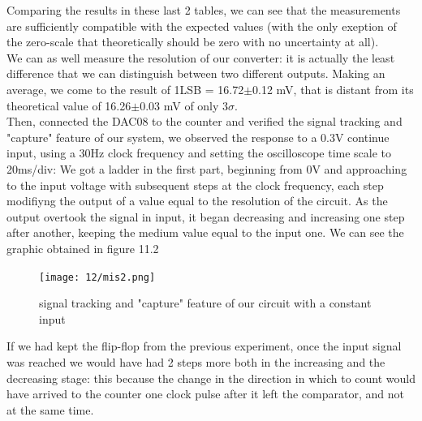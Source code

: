 Comparing the results in these last 2 tables, we can see that the measurements are sufficiently compatible with the expected values (with the only exeption of the zero-scale that theoretically should be zero with no uncertainty at all).\\
We can as well measure the resolution of our converter: it is actually the least difference that we can distinguish between two different outputs. Making an average, we come to the result of 1LSB = 16.72\(\pm\)0.12 mV, that is distant from its theoretical value of 16.26\(\pm\)0.03 mV of only 3\(\sigma\). \\
Then, connected the DAC08 to the counter and verified the signal tracking and "capture" feature of our system, we observed the response to a 0.3V continue input, using a 30Hz clock frequency and setting the oscilloscope time scale to 20ms/div: We got a ladder in the first part, beginning from 0V and approaching to the input voltage with subsequent steps at the clock frequency, each step modifiyng the output of a value equal to the resolution of the circuit. As the output overtook the signal in input, it began decreasing and increasing one step after another, keeping the medium value equal to the input one.
We can see the graphic obtained in figure 11.2\\

\begin{figure}[H]
\centering
\texttt{[image: 12/mis2.png]}
\caption{signal tracking and "capture" feature of our circuit with a constant input}
\end{figure}

If we had kept the flip-flop from the previous experiment, once the input signal was reached we would have had 2 steps more both in the increasing and the decreasing stage: this because the change in the direction in which to count would have arrived to the counter one clock pulse after it left the comparator, and not at the same time.
